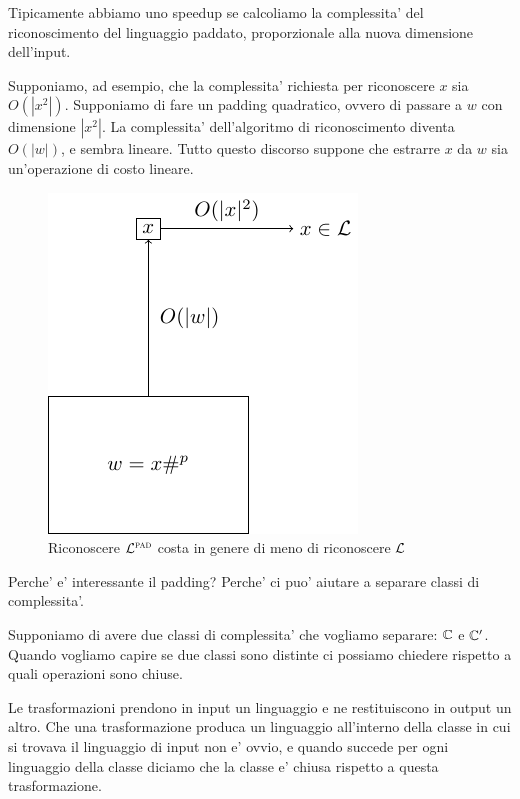 Tipicamente abbiamo uno speedup se calcoliamo la complessita' del riconoscimento del linguaggio
paddato, proporzionale alla nuova dimensione dell'input.

Supponiamo, ad esempio, che la complessita' richiesta per riconoscere $x$ sia $O(|x^{2}|)$.
Supponiamo di fare un padding quadratico, ovvero di passare a $w$ con dimensione $|x^{2}|$. La
complessita' dell'algoritmo di riconoscimento diventa $O(|w|)$, e sembra lineare. Tutto questo
discorso suppone che estrarre $x$ da $w$ sia un'operazione di costo lineare.

\begin{figure}[h]
    \begin{center}
        \includegraphics{./img/PaddingSpeedup.pdf}    
        \caption{Riconoscere $\mathcal{L}^{\textsc{pad}}$ costa in genere di meno di riconoscere $\mathcal{L}$}
    \end{center}
\end{figure}

Perche' e' interessante il padding? Perche' ci puo' aiutare a separare classi di complessita'. 

Supponiamo di avere due classi di complessita' che vogliamo separare: $\mathbb{C}$ e $\mathbb{C}'$. Quando
vogliamo capire se due classi sono distinte ci possiamo chiedere rispetto a quali operazioni sono
chiuse.

Le trasformazioni prendono in input un linguaggio e ne restituiscono in output un altro. Che una
trasformazione produca un linguaggio all'interno della classe in cui si trovava il linguaggio di
input non e' ovvio, e quando succede per ogni linguaggio della classe diciamo che la classe e'
chiusa rispetto a questa trasformazione.

